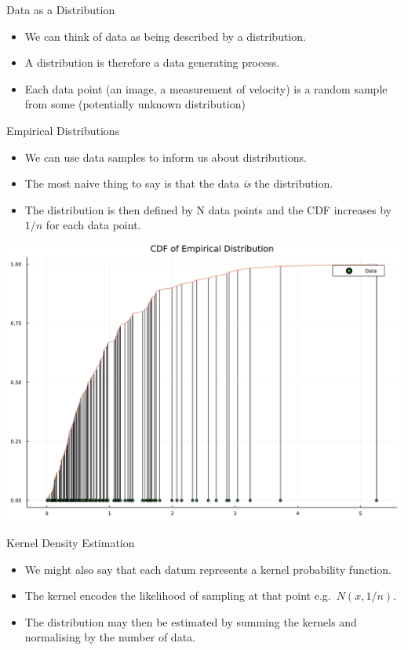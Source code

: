 \documentclass[
  ignorenonframetext,
]{beamer}
\begin{document}
\begin{frame}{Data as a Distribution}
\protect\hypertarget{data-as-a-distribution}{}
\begin{itemize}
\item
  We can think of data as being described by a distribution.
\item
  A distribution is therefore a data generating process.
\item
  Each data point (an image, a measurement of velocity) is a random
  sample from some (potentially unknown distribution)
\end{itemize}
\end{frame}

\begin{frame}{Empirical Distributions}
\protect\hypertarget{empirical-distributions}{}
\begin{itemize}
\item
  We can use data samples to inform us about distributions.
\item
  The most naive thing to say is that the data \emph{is} the
  distribution.
\item
  The distribution is then defined by N data points and the CDF
  increases by \(1/n\) for each data point.
\end{itemize}
\end{frame}

\begin{frame}{}
\protect\hypertarget{section}{}
\includegraphics{lecture1_files/figure-beamer/cell-3-output-1.pdf}
\end{frame}

\begin{frame}{Kernel Density Estimation}
\protect\hypertarget{kernel-density-estimation}{}
\begin{itemize}
\item
  We might also say that each datum represents a kernel probability
  function.
\item
  The kernel encodes the likelihood of sampling at that point
  e.g.~\(N(x,1/n)\).
\item
  The distribution may then be estimated by summing the kernels and
  normalising by the number of data.
\end{itemize}
\end{frame}
\end{document}
